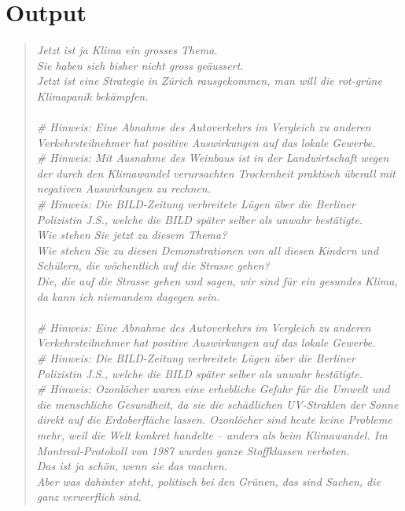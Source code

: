 \documentclass[a4paper,11pt]{report}
\newenvironment{itquote}
	{\begin{quote}\itshape}
	{\end{quote}\ignorespacesafterend}
\begin{document}
	    \section{Output}\label{sec:output}
			\begin{itquote}
				Jetzt ist ja Klima ein grosses Thema.\\
				Sie haben sich bisher nicht gross geäussert.\\
				Jetzt ist eine Strategie in Zürich rausgekommen, man will die rot-grüne Klimapanik bekämpfen.\\
				\\
				  \# Hinweis: Eine Abnahme des Autoverkehrs im Vergleich zu anderen Verkehrsteilnehmer hat positive Auswirkungen auf das lokale Gewerbe.\\
				  \# Hinweis: Mit Ausnahme des Weinbaus ist in der Landwirtschaft wegen der durch den Klimawandel verursachten Trockenheit praktisch überall mit negativen Auswirkungen zu rechnen.\\
				  \# Hinweis: Die BILD-Zeitung verbreitete Lügen über die Berliner Polizistin J.S., welche die BILD später selber als unwahr bestätigte.\\
				Wie stehen Sie jetzt zu diesem Thema?\\
				Wie stehen Sie zu diesen Demonstrationen von all diesen Kindern und Schülern, die wöchentlich auf die Strasse gehen?\\
				Die, die auf die Strasse gehen und sagen, wir sind für ein gesundes Klima, da kann ich niemandem dagegen sein.\\
				\\
				  \# Hinweis: Eine Abnahme des Autoverkehrs im Vergleich zu anderen Verkehrsteilnehmer hat positive Auswirkungen auf das lokale Gewerbe.\\
				  \# Hinweis: Die BILD-Zeitung verbreitete Lügen über die Berliner Polizistin J.S., welche die BILD später selber als unwahr bestätigte.\\
				  \# Hinweis: Ozonlöcher waren eine erhebliche Gefahr für die Umwelt und die menschliche Gesundheit, da sie die schädlichen UV-Strahlen der Sonne direkt auf die Erdoberfläche lassen. Ozonlöcher sind heute keine Probleme mehr, weil die Welt konkret handelte – anders als beim Klimawandel. Im Montreal-Protokoll von 1987 wurden ganze Stoffklassen verboten.\\
				Das ist ja schön, wenn sie das machen.\\
				Aber was dahinter steht, politisch bei den Grünen, das sind Sachen, die ganz verwerflich sind.\\

\end{itquote}
\end{document}
